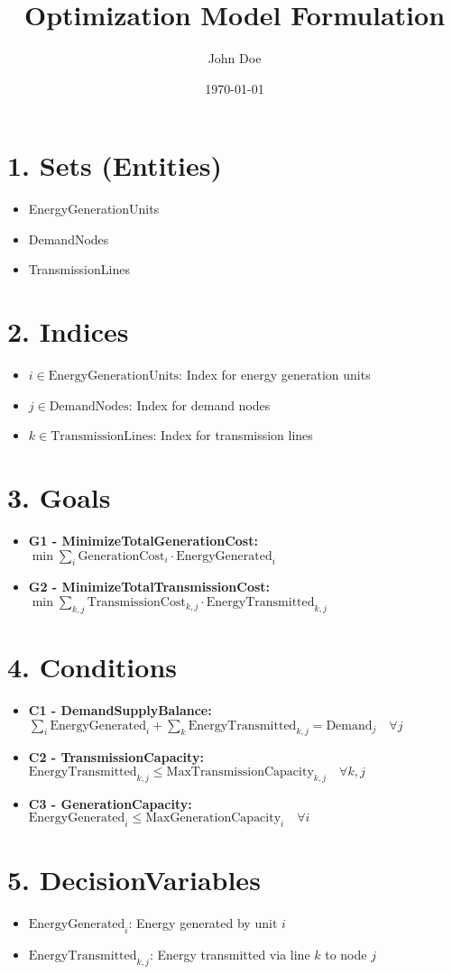 \documentclass{article}
\title{Optimization Model Formulation}
\author{John Doe}
\date{\today}
\begin{document}
\maketitle
\tableofcontents
\newpage

\section{1. Sets (Entities)}
\begin{itemize}
    \item EnergyGenerationUnits
    \item DemandNodes
    \item TransmissionLines
\end{itemize}

\section{2. Indices}
\begin{itemize}
    \item $i \in \text{EnergyGenerationUnits}$: Index for energy generation units
    \item $j \in \text{DemandNodes}$: Index for demand nodes
    \item $k \in \text{TransmissionLines}$: Index for transmission lines
\end{itemize}

\section{3. Goals}
\begin{itemize}
    \item \textbf{G1 - MinimizeTotalGenerationCost:} 
        $\min \sum_{i} \text{GenerationCost}_i \cdot \text{EnergyGenerated}_i$
    \item \textbf{G2 - MinimizeTotalTransmissionCost:} 
        $\min \sum_{k,j} \text{TransmissionCost}_{k,j} \cdot \text{EnergyTransmitted}_{k,j}$
\end{itemize}

\section{4. Conditions}
\begin{itemize}
    \item \textbf{C1 - DemandSupplyBalance:} 
        $\sum_{i} \text{EnergyGenerated}_i + \sum_{k} \text{EnergyTransmitted}_{k,j} = \text{Demand}_j \quad \forall j$
    \item \textbf{C2 - TransmissionCapacity:} 
        $\text{EnergyTransmitted}_{k,j} \leq \text{MaxTransmissionCapacity}_{k,j} \quad \forall k,j$
    \item \textbf{C3 - GenerationCapacity:} 
        $\text{EnergyGenerated}_i \leq \text{MaxGenerationCapacity}_i \quad \forall i$
\end{itemize}

\section{5. DecisionVariables}
\begin{itemize}
    \item $\text{EnergyGenerated}_i$: Energy generated by unit $i$
    \item $\text{EnergyTransmitted}_{k,j}$: Energy transmitted via line $k$ to node $j$
\end{itemize}
\end{document}
